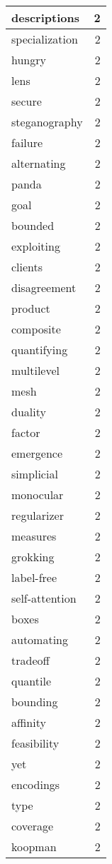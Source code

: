 \begin{table}[h]
\begin{tabular}{|l|r|}
\hline
descriptions & 2 \\
\hline
specialization & 2 \\
\hline
hungry & 2 \\
\hline
lens & 2 \\
\hline
secure & 2 \\
\hline
steganography & 2 \\
\hline
failure & 2 \\
\hline
alternating & 2 \\
\hline
panda & 2 \\
\hline
goal & 2 \\
\hline
bounded & 2 \\
\hline
exploiting & 2 \\
\hline
clients & 2 \\
\hline
disagreement & 2 \\
\hline
product & 2 \\
\hline
composite & 2 \\
\hline
quantifying & 2 \\
\hline
multilevel & 2 \\
\hline
mesh & 2 \\
\hline
duality & 2 \\
\hline
factor & 2 \\
\hline
emergence & 2 \\
\hline
simplicial & 2 \\
\hline
monocular & 2 \\
\hline
regularizer & 2 \\
\hline
measures & 2 \\
\hline
grokking & 2 \\
\hline
label-free & 2 \\
\hline
self-attention & 2 \\
\hline
boxes & 2 \\
\hline
automating & 2 \\
\hline
tradeoff & 2 \\
\hline
quantile & 2 \\
\hline
bounding & 2 \\
\hline
affinity & 2 \\
\hline
feasibility & 2 \\
\hline
yet & 2 \\
\hline
encodings & 2 \\
\hline
type & 2 \\
\hline
coverage & 2 \\
\hline
koopman & 2 \\
\hline

\end{tabular}
\end{table}
